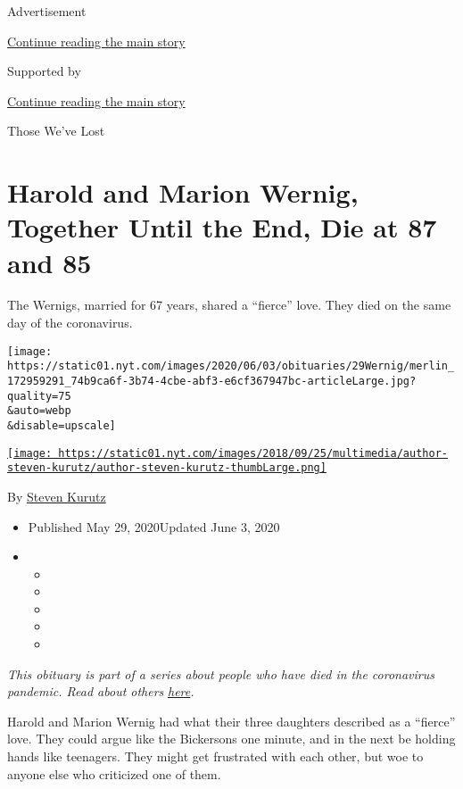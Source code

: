 Advertisement

\protect\hyperlink{after-top}{Continue reading the main story}

Supported by

\protect\hyperlink{after-sponsor}{Continue reading the main story}

Those We've Lost

\hypertarget{harold-and-marion-wernig-together-until-the-end-die-at-87-and-85}{%
\section{Harold and Marion Wernig, Together Until the End, Die at 87 and
85}\label{harold-and-marion-wernig-together-until-the-end-die-at-87-and-85}}

The Wernigs, married for 67 years, shared a ``fierce'' love. They died
on the same day of the coronavirus.

\texttt{[image: https://static01.nyt.com/images/2020/06/03/obituaries/29Wernig/merlin\_172959291\_74b9ca6f-3b74-4cbe-abf3-e6cf367947bc-articleLarge.jpg?quality=75\\\&auto=webp\\\&disable=upscale]}

\href{https://www.nytimes.com/by/steven-kurutz}{\texttt{[image: https://static01.nyt.com/images/2018/09/25/multimedia/author-steven-kurutz/author-steven-kurutz-thumbLarge.png]}}

By \href{https://www.nytimes.com/by/steven-kurutz}{Steven Kurutz}

\begin{itemize}
\item
  Published May 29, 2020Updated June 3, 2020
\item
  \begin{itemize}
  \item
  \item
  \item
  \item
  \item
  \end{itemize}
\end{itemize}

\emph{This obituary is part of a series about people who have died in
the coronavirus pandemic. Read about others}
\href{https://www.nytimes.com/interactive/2020/obituaries/people-died-coronavirus-obituaries.html}{\emph{here}}\emph{.}

Harold and Marion Wernig had what their three daughters described as a
``fierce'' love. They could argue like the Bickersons one minute, and in
the next be holding hands like teenagers. They might get frustrated with
each other, but woe to anyone else who criticized one of them.

